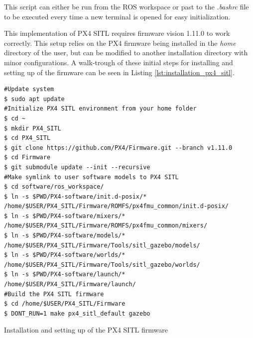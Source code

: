 \documentclass[../Head/report.tex]{subfiles}
\begin{document}
This script can either be run from the ROS workspace or past to the \textit{.bashrc} file to be executed every time a new terminal is opened for easy initialization. 

This implementation of PX4 SITL requires firmware vision 1.11.0 to work correctly. This setup relies on the PX4 firmware being installed in the \textit{home} directory of the user, but can be modified to another installation directory with minor configurations. A walk-trough of these initial steps for installing and setting up of the firmware can be seen in Listing \ref{lst:installation_px4_sitl}. 

\begin{listing}[H] 
\begin{tcolorbox}[
    enhanced,
    attach boxed title to top left={xshift=6mm,yshift=-3mm},
    colback=lightgreen!20,
    colframe=lightgreen,
    fonttitle=\bfseries\color{black},
]
\begin{verbatim}
#Update system 
$ sudo apt update 
#Initialize PX4 SITL environment from your home folder
$ cd ~
$ mkdir PX4_SITL
$ cd PX4_SITL
$ git clone https://github.com/PX4/Firmware.git --branch v1.11.0
$ cd Firmware
$ git submodule update --init --recursive
#Make symlink to user software models to PX4 SITL
$ cd software/ros_workspace/
$ ln -s $PWD/PX4-software/init.d-posix/* /home/$USER/PX4_SITL/Firmware/ROMFS/px4fmu_common/init.d-posix/
$ ln -s $PWD/PX4-software/mixers/* /home/$USER/PX4_SITL/Firmware/ROMFS/px4fmu_common/mixers/
$ ln -s $PWD/PX4-software/models/* /home/$USER/PX4_SITL/Firmware/Tools/sitl_gazebo/models/
$ ln -s $PWD/PX4-software/worlds/* /home/$USER/PX4_SITL/Firmware/Tools/sitl_gazebo/worlds/
$ ln -s $PWD/PX4-software/launch/* /home/$USER/PX4_SITL/Firmware/launch/
#Build the PX4 SITL firmware
$ cd /home/$USER/PX4_SITL/Firmware
$ DONT_RUN=1 make px4_sitl_default gazebo
\end{verbatim}
\end{tcolorbox}
\caption{Installation and setting up of the PX4 SITL firmware}
\label{lst:installation_px4_sitl}    
\end{listing}  
\end{document}
